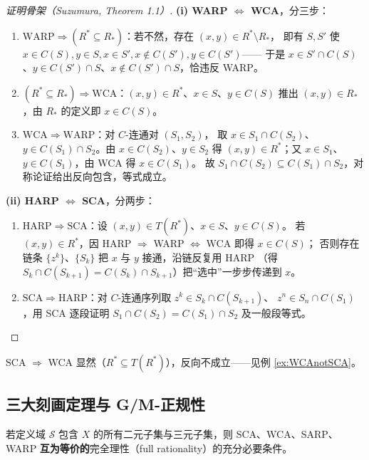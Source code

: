 \begin{proof}[证明骨架（Suzumura, Theorem 1.1）]
\textbf{(i) WARP $\iff$ WCA}，分三步：
\begin{enumerate}
  \item $\mathrm{WARP} \Rightarrow (R^*\subseteq R_*)$：若不然，存在 $(x,y)\in R^*\setminus R_*$，
  即有 $S,S'$ 使 $x\in C(S), y\in S, x\in S', x\notin C(S'), y\in C(S')$——
  于是 $x\in S'\cap C(S)$、$y\in C(S')\cap S$、$x\notin C(S')\cap S$，恰违反 WARP。
  \item $(R^*\subseteq R_*) \Rightarrow \mathrm{WCA}$：$(x,y)\in R^*$、$x\in S$、$y\in C(S)$
  推出 $(x,y)\in R_*$，由 $R_*$ 的定义即 $x\in C(S)$。
  \item $\mathrm{WCA} \Rightarrow \mathrm{WARP}$：对 $C$-连通对 $(S_1,S_2)$，
  取 $x\in S_1\cap C(S_2)$、$y\in C(S_1)\cap S_2$。由 $x\in C(S_2)$、$y\in S_2$ 得
  $(x,y)\in R^*$；又 $x\in S_1$、$y\in C(S_1)$，由 WCA 得 $x\in C(S_1)$。
  故 $S_1\cap C(S_2)\subseteq C(S_1)\cap S_2$，对称论证给出反向包含，等式成立。
\end{enumerate}
\textbf{(ii) HARP $\iff$ SCA}，分两步：
\begin{enumerate}
  \item $\mathrm{HARP} \Rightarrow \mathrm{SCA}$：设 $(x,y)\in T(R^*)$、$x\in S$、$y\in C(S)$。
  若 $(x,y)\in R^*$，因 HARP $\Rightarrow$ WARP $\iff$ WCA 即得 $x\in C(S)$；
  否则存在链条 $\{z^k\}$、$\{S_k\}$ 把 $x$ 与 $y$ 接通，沿链反复用 HARP
  （得 $S_k\cap C(S_{k+1})=C(S_k)\cap S_{k+1}$）把“选中”一步步传递到 $x$。
  \item $\mathrm{SCA} \Rightarrow \mathrm{HARP}$：对 $C$-连通序列取 $z^k\in S_k\cap C(S_{k+1})$、
  $z^n\in S_n\cap C(S_1)$，用 SCA 逐段证明 $S_1\cap C(S_2)=C(S_1)\cap S_2$ 及一般段等式。
\end{enumerate}
\end{proof}

\begin{remark}
SCA $\Rightarrow$ WCA 显然（$R^*\subseteq T(R^*)$），反向不成立——见例 \ref{ex:WCAnotSCA}。
\end{remark}

\subsection{三大刻画定理与 G/M-正规性}

\begin{theorem}
若定义域 $\mathcal{S}$ 包含 $X$ 的所有二元子集与三元子集，则
SCA、WCA、SARP、WARP \textbf{互为等价的}完全理性（full rationality）的充分必要条件。
\end{theorem}

